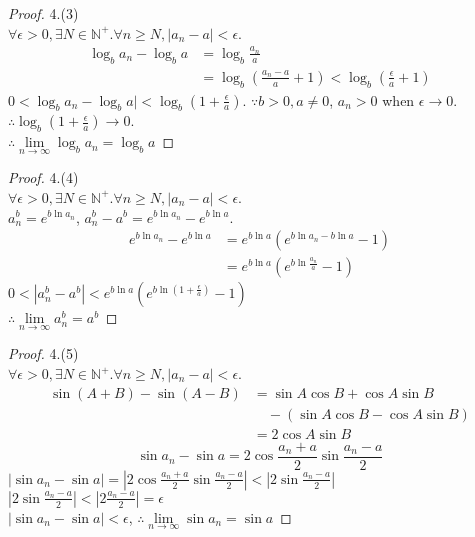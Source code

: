 \begin{proof}4.(3)\\
	$\forall \epsilon >0, \exists N \in \mathbb{N}^+. \forall n \geqslant N, |a_n-a| < \epsilon$.\\
	\begin{align*}
		\log_{b}a_n-\log_{b}a
		&=\log_{b}\frac{a_n}{a}\\
		&=\log_{b}(\frac{a_n-a}{a}+1) < \log_{b}(\frac{\epsilon}{a}+1)
	\end{align*}
	$ 0<\log_{b}a_n-\log_{b}a|<\log_{b}(1+\frac{\epsilon}{a}) $.
	$ \because b>0, a\neq 0$,  $ a_n>0 $ when $ \epsilon\rightarrow0 $. $ \therefore \log_{b}(1+\frac{\epsilon}{a})\rightarrow0 $.\\
	$ \therefore \lim\limits_{n\rightarrow\infty}\log_{b}a_n=\log_{b}a $	
\end{proof} 

\begin{proof}4.(4)\\
	$\forall \epsilon >0, \exists N \in \mathbb{N}^+. \forall n \geqslant N, |a_n-a| < \epsilon$.\\
	$ a_n^b = e^{b\ln a_n} $, $ a_n^b-a^b = e^{b\ln a_n}-e^{b\ln a} $.
	\begin{align*}
			e^{b\ln a_n}-e^{b\ln a}
			&=e^{b\ln a}(e^{b\ln a_n-b\ln a}-1)\\
			&=e^{b\ln a}(e^{b\ln \frac{a_n}{a}}-1)
	\end{align*}
	$ 0 < |a_n^b-a^b| < e^{b\ln a}(e^{b\ln (1+\frac{\epsilon}{a})}-1) $\\
	$ \therefore \lim\limits_{n\rightarrow\infty}a_n^b = a^b $
\end{proof}


\begin{proof}4.(5)\\
	$\forall \epsilon >0, \exists N \in \mathbb{N}^+. \forall n \geqslant N, |a_n-a| < \epsilon$.\\
	\begin{align*}
		\sin(A+B)-\sin(A-B) &= \sin{A}\cos{B}+\cos{A}\sin{B} \\
		&\quad- (\sin{A}\cos{B}-\cos{A}\sin{B}) \\
		&= 2\cos{A}\sin{B}
	\end{align*}
	\begin{equation*}
		\sin a_n - \sin a  = 2\cos\frac{a_n+a}{2}\sin\frac{a_n-a}{2}
	\end{equation*}
	$|\sin a_n-\sin a| = |2\cos\frac{a_n+a}{2}\sin\frac{a_n-a}{2}|< |2\sin\frac{a_n-a}{2}|$\\
	$ |2\sin\frac{a_n-a}{2}|<|2\frac{a_n-a}{2}|=\epsilon $\\
	$ |\sin{a_n}-\sin{a}|<\epsilon $, $ \therefore \lim\limits_{n\rightarrow\infty}\sin{a_n} = \sin a  $
\end{proof}

